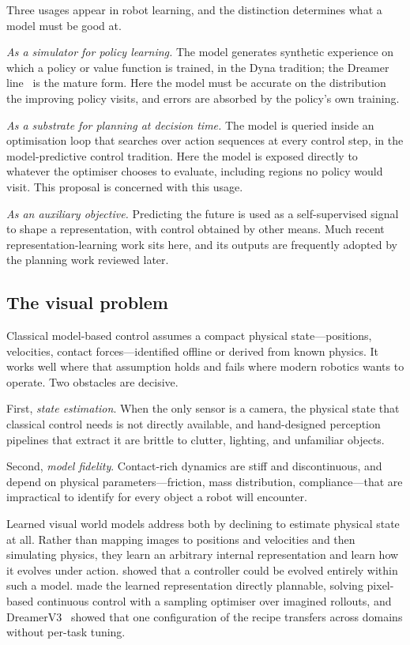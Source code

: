 \documentclass[11pt,letterpaper]{article}
\begin{document}
Three usages appear in robot learning, and the distinction determines what a
model must be good at.

\emph{As a simulator for policy learning.} The model generates synthetic
experience on which a policy or value function is trained, in the Dyna
tradition; the Dreamer line~\citep{hafner2019planet,hafner2025dreamerv3} is the
mature form. Here the model must be accurate on the distribution the improving
policy visits, and errors are absorbed by the policy's own training.

\emph{As a substrate for planning at decision time.} The model is queried inside
an optimisation loop that searches over action sequences at every control step,
in the model-predictive control tradition. Here the model is exposed directly to
whatever the optimiser chooses to evaluate, including regions no policy would
visit. This proposal is concerned with this usage.

\emph{As an auxiliary objective.} Predicting the future is used as a
self-supervised signal to shape a representation, with control obtained by other
means. Much recent representation-learning work sits here, and its outputs are
frequently adopted by the planning work reviewed later.

\subsection{The visual problem}

Classical model-based control assumes a compact physical state---positions,
velocities, contact forces---identified offline or derived from known physics. It
works well where that assumption holds and fails where modern robotics wants to
operate. Two obstacles are decisive.

First, \emph{state estimation}. When the only sensor is a camera, the physical
state that classical control needs is not directly available, and hand-designed
perception pipelines that extract it are brittle to clutter, lighting, and
unfamiliar objects.

Second, \emph{model fidelity}. Contact-rich dynamics are stiff and
discontinuous, and depend on physical parameters---friction, mass distribution,
compliance---that are impractical to identify for every object a robot will
encounter.

Learned visual world models address both by declining to estimate physical state
at all. Rather than mapping images to positions and velocities and then
simulating physics, they learn an arbitrary internal representation and learn how
it evolves under action. \citet{ha2018worldmodels} showed that a controller could
be evolved entirely within such a model. \citet{hafner2019planet} made the
learned representation directly plannable, solving pixel-based continuous control
with a sampling optimiser over imagined rollouts, and
DreamerV3~\citep{hafner2025dreamerv3} showed that one configuration of the recipe
transfers across domains without per-task tuning.
\end{document}

